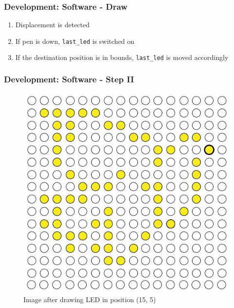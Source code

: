 \documentclass{beamer}
\begin{document}
\begin{frame}
\frametitle{Development: Software - Draw}

\begin{enumerate}
\item Displacement is detected
\item If pen is down, {\tt last\_led} is switched on
\item If the destination position is in bounds, {\tt last\_led} is moved accordingly
\end{enumerate}

\end{frame}

\begin{frame}
\frametitle{Development: Software - Step II }

\begin{figure}
	\includegraphics[scale=0.4]{images/example_2.jpg}
	\caption{Image after drawing LED in position (15, 5)}
\end{figure}

\end{frame}
\end{document}
